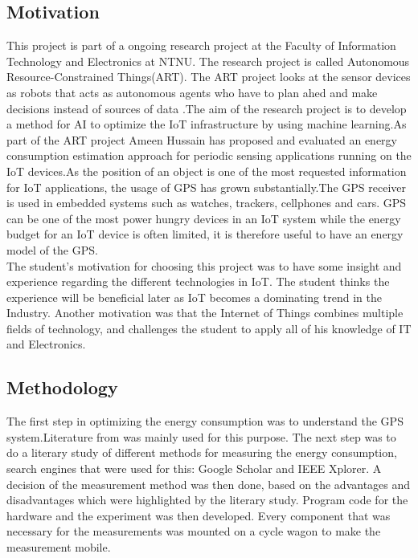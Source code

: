\subsection{Motivation}

This project is part of a ongoing research project at the Faculty of Information Technology and Electronics at NTNU. The research project is called Autonomous Resource-Constrained Things(ART).  The ART project looks at the sensor devices as robots that acts as autonomous agents who have to plan ahed and make decisions instead of sources of data \cite{kraemer}.The aim of the research project is to develop a method for AI to optimize the IoT infrastructure by using machine learning.As part of the ART project Ameen Hussain has proposed and evaluated an energy consumption estimation approach for periodic sensing applications running on the IoT devices\cite{Amen}.As the position of an object is one of the most requested information for IoT applications, the usage of GPS has grown substantially.The GPS receiver is used in embedded systems such as watches, trackers, cellphones and cars. GPS can be one of the most power hungry devices in an IoT system while the energy budget for an IoT device is often limited, it is therefore useful to have an energy model of the GPS.\\

The student's motivation for choosing this project was to have some insight and experience regarding the different technologies in IoT. The student thinks the experience will be beneficial later as IoT becomes a dominating trend in the Industry. Another motivation was that the Internet of Things combines multiple fields of technology, and challenges the student to apply all of his knowledge of IT and Electronics.


\subsection{Methodology}


The first step in optimizing the energy consumption was to understand the GPS system.Literature from  \cite{GPS} was mainly used for this purpose. The next step was to do a literary study of different methods for measuring the energy consumption, search engines that were used for this: Google Scholar and IEEE Xplorer. 
A decision of the measurement method was then done, based on the advantages and disadvantages which were highlighted by the literary study. Program code for the hardware and the experiment was then developed. Every component that was necessary for the measurements was mounted on a cycle wagon to make the measurement mobile.

